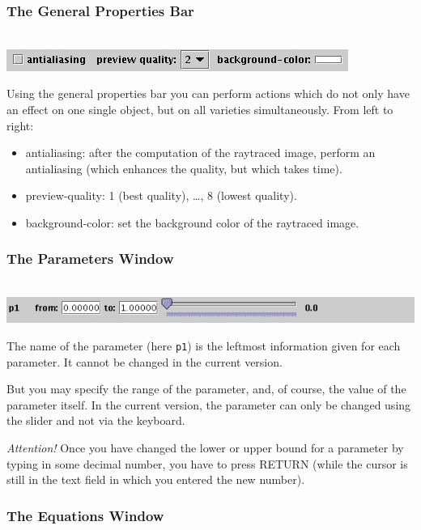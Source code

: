 \documentclass{article}
\newcommand{\attention}{\emph{Attention!}}
\begin{document}
\subsubsection{The General Properties Bar}

\ \\\includegraphics[scale=0.6]{surfex_general_prop_bar}

Using the general properties bar you can perform actions which do not
only have an effect on one single object, but on all varieties
simultaneously.
From left to right:
\begin{itemize}
\item antialiasing: after the computation of the raytraced image, perform an
  antialiasing (which enhances the quality, but which takes time).
\item preview-quality: 1 (best quality), \dots, 8 (lowest quality).
\item background-color: set the background color of the raytraced image.
\end{itemize}


\subsubsection{The Parameters Window}

\ \\\includegraphics[scale=0.5]{surfex_parameters}

The name of the parameter (here {\tt p1}) is the leftmost information given
for each parameter.
It cannot be changed in the current version.

But you may specify the range of the parameter, and, of course, the value
of the parameter itself.
In the current version, the parameter can only be changed using the slider and
not via the keyboard.

\attention{}
Once you have changed the lower or upper bound for a
parameter by typing in some decimal number, you have to press RETURN (while
the cursor is still in the text field in which you entered the new number).


\subsubsection{The Equations Window}
\end{document}
